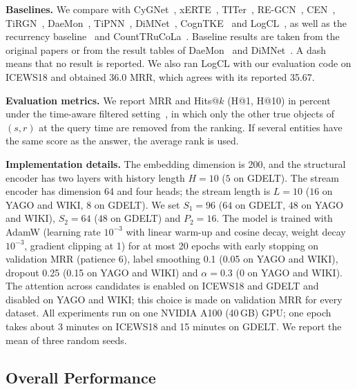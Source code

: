\documentclass[runningheads]{llncs}
\makeatletter
\newcommand{\hone}{H@1}
\newcommand{\hten}{H@10}
\newcommand{\para}[1]{\smallskip\noindent\textbf{#1}}
\makeatother
\begin{document}
\para{Baselines.} We compare with CyGNet~\cite{zhu2021cygnet}, xERTE~\cite{han2021xerte}, TITer~\cite{sun2021titer}, RE-GCN~\cite{li2021regcn}, CEN~\cite{li2022cen}, TiRGN~\cite{li2022tirgn}, DaeMon~\cite{dong2023daemon}, TiPNN~\cite{dong2024tipnn}, DiMNet~\cite{dong2025dimnet}, CognTKE~\cite{chen2025cogntke} and LogCL~\cite{chen2024logcl}, as well as the recurrency baseline~\cite{gastinger2024history} and CountTRuCoLa~\cite{gastinger2026counttrucola}. Baseline results are taken from the original papers or from the result tables of DaeMon~\cite{dong2023daemon} and DiMNet~\cite{dong2025dimnet}. A dash means that no result is reported. We also ran LogCL with our evaluation code on ICEWS18 and obtained 36.0 MRR, which agrees with its reported 35.67.

\para{Evaluation metrics.} We report MRR and Hits@$k$ (\hone{}, \hten{}) in percent under the time-aware filtered setting~\cite{gastinger2023apples}, in which only the other true objects of $(s, r)$ at the query time are removed from the ranking. If several entities have the same score as the answer, the average rank is used.

\para{Implementation details.} The embedding dimension is 200, and the structural encoder has two layers with history length $H = 10$ ($5$ on GDELT). The stream encoder has dimension 64 and four heads; the stream length is $L = 10$ ($16$ on YAGO and WIKI, $8$ on GDELT). We set $S_1 = 96$ ($64$ on GDELT, $48$ on YAGO and WIKI), $S_2 = 64$ ($48$ on GDELT) and $P_2 = 16$. The model is trained with AdamW (learning rate $10^{-3}$ with linear warm-up and cosine decay, weight decay $10^{-3}$, gradient clipping at 1) for at most 20 epochs with early stopping on validation MRR (patience 6), label smoothing 0.1 (0.05 on YAGO and WIKI), dropout 0.25 (0.15 on YAGO and WIKI) and $\alpha = 0.3$ ($0$ on YAGO and WIKI). The attention across candidates is enabled on ICEWS18 and GDELT and disabled on YAGO and WIKI; this choice is made on validation MRR for every dataset. All experiments run on one NVIDIA A100 (40\,GB) GPU; one epoch takes about 3 minutes on ICEWS18 and 15 minutes on GDELT. We report the mean of three random seeds.

\subsection{Overall Performance}
\end{document}
